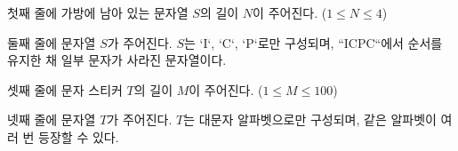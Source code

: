 
첫째 줄에 가방에 남아 있는 문자열 $S$의 길이 $N$이 주어진다. ($1 \le N \le 4$)

둘째 줄에 문자열 $S$가 주어진다. $S$는 `I`, `C`, `P`로만 구성되며, ``ICPC``에서 순서를 유지한 채 일부 문자가 사라진 문자열이다.

셋째 줄에 문자 스티커 $T$의 길이 $M$이 주어진다. ($1 \le M \le 100$)

넷째 줄에 문자열 $T$가 주어진다. $T$는 대문자 알파벳으로만 구성되며, 같은 알파벳이 여러 번 등장할 수 있다.